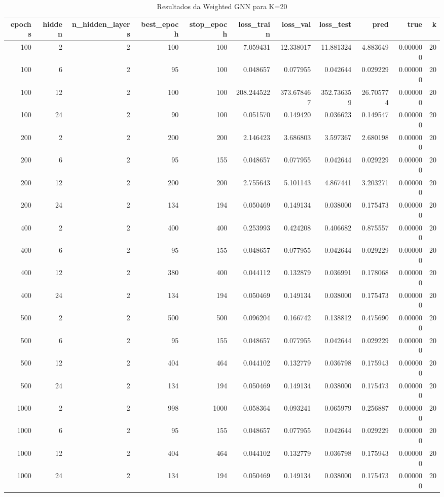 \begin{table}
\caption{Resultados da Weighted GNN para K=20}
\label{tab:weighted_gnn_results_k20}
\begin{tabular}{rrrrrrrrrrr}
\toprule
epochs & hidden & n\_hidden\_layers & best\_epoch & stop\_epoch & loss\_train & loss\_val & loss\_test & pred & true & k \\
\midrule
100 & 2 & 2 & 100 & 100 & 7.059431 & 12.338017 & 11.881324 & 4.883649 & 0.000000 & 20 \\
100 & 6 & 2 & 95 & 100 & 0.048657 & 0.077955 & 0.042644 & 0.029229 & 0.000000 & 20 \\
100 & 12 & 2 & 100 & 100 & 208.244522 & 373.678467 & 352.736359 & 26.705774 & 0.000000 & 20 \\
100 & 24 & 2 & 90 & 100 & 0.051570 & 0.149420 & 0.036623 & 0.149547 & 0.000000 & 20 \\
200 & 2 & 2 & 200 & 200 & 2.146423 & 3.686803 & 3.597367 & 2.680198 & 0.000000 & 20 \\
200 & 6 & 2 & 95 & 155 & 0.048657 & 0.077955 & 0.042644 & 0.029229 & 0.000000 & 20 \\
200 & 12 & 2 & 200 & 200 & 2.755643 & 5.101143 & 4.867441 & 3.203271 & 0.000000 & 20 \\
200 & 24 & 2 & 134 & 194 & 0.050469 & 0.149134 & 0.038000 & 0.175473 & 0.000000 & 20 \\
400 & 2 & 2 & 400 & 400 & 0.253993 & 0.424208 & 0.406682 & 0.875557 & 0.000000 & 20 \\
400 & 6 & 2 & 95 & 155 & 0.048657 & 0.077955 & 0.042644 & 0.029229 & 0.000000 & 20 \\
400 & 12 & 2 & 380 & 400 & 0.044112 & 0.132879 & 0.036991 & 0.178068 & 0.000000 & 20 \\
400 & 24 & 2 & 134 & 194 & 0.050469 & 0.149134 & 0.038000 & 0.175473 & 0.000000 & 20 \\
500 & 2 & 2 & 500 & 500 & 0.096204 & 0.166742 & 0.138812 & 0.475690 & 0.000000 & 20 \\
500 & 6 & 2 & 95 & 155 & 0.048657 & 0.077955 & 0.042644 & 0.029229 & 0.000000 & 20 \\
500 & 12 & 2 & 404 & 464 & 0.044102 & 0.132779 & 0.036798 & 0.175943 & 0.000000 & 20 \\
500 & 24 & 2 & 134 & 194 & 0.050469 & 0.149134 & 0.038000 & 0.175473 & 0.000000 & 20 \\
1000 & 2 & 2 & 998 & 1000 & 0.058364 & 0.093241 & 0.065979 & 0.256887 & 0.000000 & 20 \\
1000 & 6 & 2 & 95 & 155 & 0.048657 & 0.077955 & 0.042644 & 0.029229 & 0.000000 & 20 \\
1000 & 12 & 2 & 404 & 464 & 0.044102 & 0.132779 & 0.036798 & 0.175943 & 0.000000 & 20 \\
1000 & 24 & 2 & 134 & 194 & 0.050469 & 0.149134 & 0.038000 & 0.175473 & 0.000000 & 20 \\
\bottomrule
\end{tabular}
\end{table}
